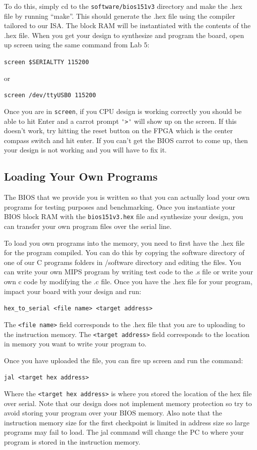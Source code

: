 \documentclass[11pt]{article}
\begin{document}
\begin{appendices}
To do this, simply cd to the \verb|software/bios151v3| directory and make the .hex file by running
“make”. This should generate the .hex file using the compiler tailored to our ISA. The
block RAM will be instantiated with the contents of the .hex file.
When you get your design to synthesize and program the board, open up screen using the
same command from Lab 5:

\verb|screen $SERIALTTY 115200|

or

\verb|screen /dev/ttyUSB0 115200|

Once you are in \verb|screen|, if you CPU design is working correctly you should be able to hit Enter
and a carrot prompt \verb|'>'| will show up on the screen. If this doesn’t work, try hitting the reset
button on the FPGA which is the center compass switch and hit enter. If you can’t get the BIOS
carrot to come up, then your design is not working and you will have to fix it.

\subsection{Loading Your Own Programs}
The BIOS that we provide you is written so that you can actually load your own programs for
testing purposes and benchmarking. Once you instantiate your BIOS block RAM with the
\verb|bios151v3.hex| file and synthesize your design, you can transfer your own program files over the
serial line.

To load you own programs into the memory, you need to first have the .hex file for the program
compiled. You can do this by copying the software directory of one of our C programs folders in
/software directory and editing the files. You can write your own MIPS program by writing
test code to the .s file or write your own c code by modifying the .c file.
Once you have the .hex file for your program, impact your board with your design and run:

\verb|hex_to_serial <file name> <target address>|

The \verb|<file name>| field corresponds to the .hex file that you are to uploading to the instruction
memory. The \verb|<target address>| field corresponds to the location in memory you want to write
your program to.

Once you have uploaded the file, you can fire up screen and run the command:

\verb|jal <target hex address>|

Where the \verb|<target hex address>| is where you stored the location of the hex file over
serial. Note that our design does not implement memory protection so try to avoid storing your
program over your BIOS memory. Also note that the instruction memory size for the first
checkpoint is limited in address size so large programs may fail to load.
The jal command will change the PC to where your program is stored in the instruction
memory.


\end{appendices}
\end{document}
